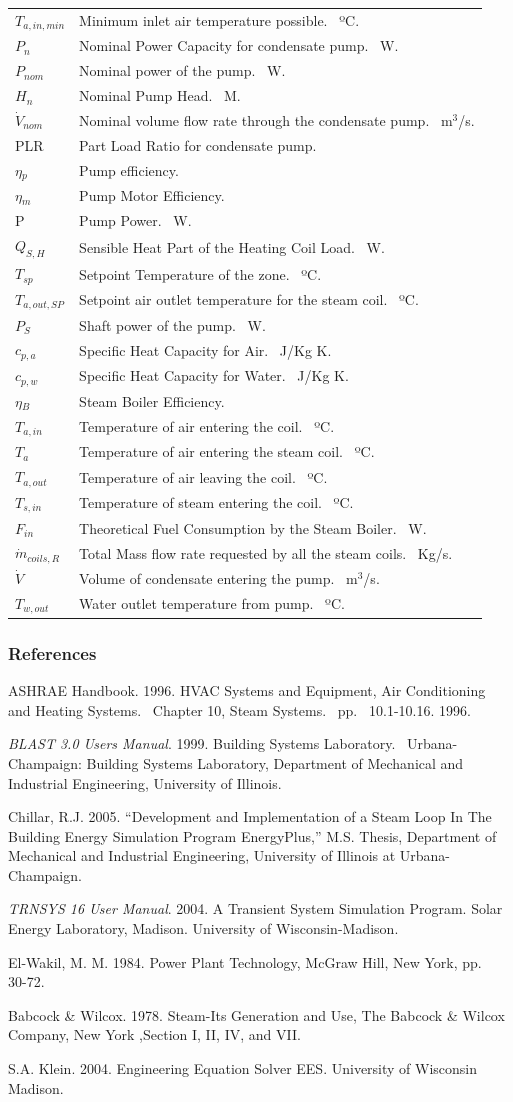 \begin{longtable}[c]{p{1.0in}p{4.0in}}
\(T_{a,in,min}\) & Minimum inlet air temperature possible.~ ºC. \tabularnewline
\(P_{n}\) & Nominal Power Capacity for condensate pump.~ W. \tabularnewline
\(P_{nom}\) & Nominal power of the pump.~ W. \tabularnewline
\(H_{n}\) & Nominal Pump Head.~ M. \tabularnewline
\(\dot V_{nom}\) & Nominal volume flow rate through the condensate pump.~ m\(^3\)/s. \tabularnewline
PLR & Part Load Ratio for condensate pump. \tabularnewline
\(\eta\)\(_{p}\) & Pump efficiency. \tabularnewline
\(\eta\)\(_{m}\) & Pump Motor Efficiency. \tabularnewline
P & Pump Power.~ W. \tabularnewline
\(Q_{S,H}\) & Sensible Heat Part of the Heating Coil Load.~ W. \tabularnewline
\(T_{sp}\) & Setpoint Temperature of the zone.~ ºC. \tabularnewline
\(T_{a,out,SP}\) & Setpoint air outlet temperature for the steam coil.~ ºC. \tabularnewline
\(P_{S}\) & Shaft power of the pump.~ W. \tabularnewline
\(c_{p,a}\) & Specific Heat Capacity for Air.~ J/Kg K. \tabularnewline
\(c_{p,w}\) & Specific Heat Capacity for Water.~ J/Kg K. \tabularnewline
\(\eta\)\(_{B}\) & Steam Boiler Efficiency. \tabularnewline
\(T_{a,in}\) & Temperature of air entering the coil.~ ºC. \tabularnewline
\(T_{a}\) & Temperature of air entering the steam coil.~ ºC. \tabularnewline
\(T_{a,out}\) & Temperature of air leaving the coil.~ ºC. \tabularnewline
\(T_{s,in}\) & Temperature of steam entering the coil.~ ºC. \tabularnewline
\(F_{in}\) & Theoretical Fuel Consumption by the Steam Boiler.~ W. \tabularnewline
\(\dot m_{coils,R}\) & Total Mass flow rate requested by all the steam coils.~ Kg/s. \tabularnewline
\(\dot V\) & Volume of condensate entering the pump.~ m\(^3\)/s. \tabularnewline
\(T_{w,out}\) & Water outlet temperature from pump.~ ºC. \tabularnewline
\bottomrule
\end{longtable}

\subsubsection{References}\label{references-007}

ASHRAE Handbook. 1996. HVAC Systems and Equipment, Air Conditioning and Heating Systems.~ Chapter 10, Steam Systems.~ pp.\emph{~} 10.1-10.16. 1996.

\emph{BLAST 3.0 Users Manual}. 1999. Building Systems Laboratory.~ Urbana-Champaign: Building Systems Laboratory, Department of Mechanical and Industrial Engineering, University of Illinois.

Chillar, R.J. 2005. ``Development and Implementation of a Steam Loop In The Building Energy Simulation Program EnergyPlus,'' M.S. Thesis, Department of Mechanical and Industrial Engineering, University of Illinois at Urbana-Champaign.

\emph{TRNSYS 16 User Manual}. 2004. A Transient System Simulation Program. Solar Energy Laboratory, Madison. University of Wisconsin-Madison.

El-Wakil, M. M. 1984. Power Plant Technology, McGraw Hill, New York, pp.~~ 30-72.

Babcock \& Wilcox. 1978. Steam-Its Generation and Use, The Babcock \& Wilcox Company, New York ,Section I, II, IV, and VII.

S.A. Klein. 2004. Engineering Equation Solver EES. University of Wisconsin Madison.
